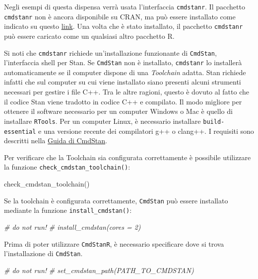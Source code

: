 \documentclass[
]{memoir}
\newenvironment{Shaded}{\begin{snugshade}}{\end{snugshade}}
\newcommand{\CommentTok}[1]{\textcolor[rgb]{0.56,0.35,0.01}{\textit{#1}}}
\newcommand{\FunctionTok}[1]{\textcolor[rgb]{0.00,0.00,0.00}{#1}}
\newcommand{\NormalTok}[1]{#1}
\begin{document}
Negli esempi di questa dispensa verrà usata l'interfaccia \texttt{cmdstanr}. Il pacchetto \texttt{cmdstanr} non è ancora disponibile su CRAN, ma può essere installato come indicato su questo \href{https://mc-stan.org/docs/2_27/cmdstan-guide/cmdstan-installation.html}{link}. Una volta che è stato installato, il pacchetto \texttt{cmdstanr} può essere caricato come un qualsiasi altro pacchetto R.

Si noti che \texttt{cmdstanr} richiede un'installazione funzionante di \texttt{CmdStan}, l'interfaccia shell per Stan. Se \texttt{CmdStan} non è installato, \texttt{cmdstanr} lo installerà automaticamente se il computer dispone di una \emph{Toolchain} adatta. Stan richiede infatti che sul computer su cui viene installato siano presenti alcuni strumenti necessari per gestire i file C++. Tra le altre ragioni, questo è dovuto al fatto che il codice Stan viene tradotto in codice C++ e compilato. Il modo migliore per ottenere il software necessario per un computer Windows o Mac è quello di installare \texttt{RTools}. Per un computer Linux, è necessario installare \texttt{build-essential} e una versione recente dei compilatori g++ o clang++. I requisiti sono descritti nella \href{https://mc-stan.org/docs/cmdstan-guide/cmdstan-installation.html}{Guida di CmdStan}.

Per verificare che la Toolchain sia configurata correttamente è possibile utilizzare la funzione \texttt{check\_cmdstan\_toolchain()}:

\begin{Shaded}
\begin{Highlighting}[]
\FunctionTok{check\_cmdstan\_toolchain}\NormalTok{()}
\end{Highlighting}
\end{Shaded}

\noindent
Se la toolchain è configurata correttamente, \texttt{CmdStan} può essere installato mediante la funzione \texttt{install\_cmdstan()}:

\begin{Shaded}
\begin{Highlighting}[]
\CommentTok{\# do not run!}
\CommentTok{\# install\_cmdstan(cores = 2)}
\end{Highlighting}
\end{Shaded}

\noindent
Prima di poter utilizzare \texttt{CmdStanR}, è necessario specificare dove si trova l'installazione di \texttt{CmdStan}.

\begin{Shaded}
\begin{Highlighting}[]
\CommentTok{\# do not run!}
\CommentTok{\# set\_cmdstan\_path(PATH\_TO\_CMDSTAN)}
\end{Highlighting}
\end{Shaded}
\end{document}
